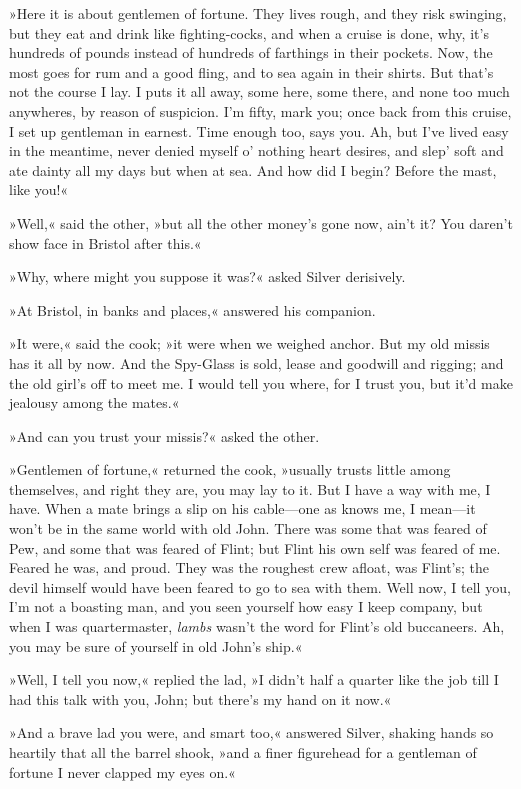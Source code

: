 »Here it is about gentlemen of fortune. They lives rough, and they risk swinging, but they eat and drink like fighting-cocks, and when a cruise is done, why, it's hundreds of pounds instead of hundreds of farthings in their pockets. Now, the most goes for rum and a good fling, and to sea again in their shirts. But that's not the course I lay. I puts it all away, some here, some there, and none too much anywheres, by reason of suspicion. I'm fifty, mark you; once back from this cruise, I set up gentleman in earnest. Time enough too, says you. Ah, but I've lived easy in the meantime, never denied myself o' nothing heart desires, and slep' soft and ate dainty all my days but when at sea. And how did I begin? Before the mast, like you!«

»Well,« said the other, »but all the other money's gone now, ain't it? You daren't show face in Bristol after this.«

»Why, where might you suppose it was?« asked Silver derisively.

»At Bristol, in banks and places,« answered his companion.

»It were,« said the cook; »it were when we weighed anchor. But my old missis has it all by now. And the Spy-Glass is sold, lease and goodwill and rigging; and the old girl's off to meet me. I would tell you where, for I trust you, but it'd make jealousy among the mates.«

»And can you trust your missis?« asked the other.

»Gentlemen of fortune,« returned the cook, »usually trusts little among themselves, and right they are, you may lay to it. But I have a way with me, I have. When a mate brings a slip on his cable—one as knows me, I mean—it won't be in the same world with old John. There was some that was feared of Pew, and some that was feared of Flint; but Flint his own self was feared of me. Feared he was, and proud. They was the roughest crew afloat, was Flint's; the devil himself would have been feared to go to sea with them. Well now, I tell you, I'm not a boasting man, and you seen yourself how easy I keep company, but when I was quartermaster, \textit{lambs} wasn't the word for Flint's old buccaneers. Ah, you may be sure of yourself in old John's ship.«

»Well, I tell you now,« replied the lad, »I didn't half a quarter like the job till I had this talk with you, John; but there's my hand on it now.«

»And a brave lad you were, and smart too,« answered Silver, shaking hands so heartily that all the barrel shook, »and a finer figurehead for a gentleman of fortune I never clapped my eyes on.«

